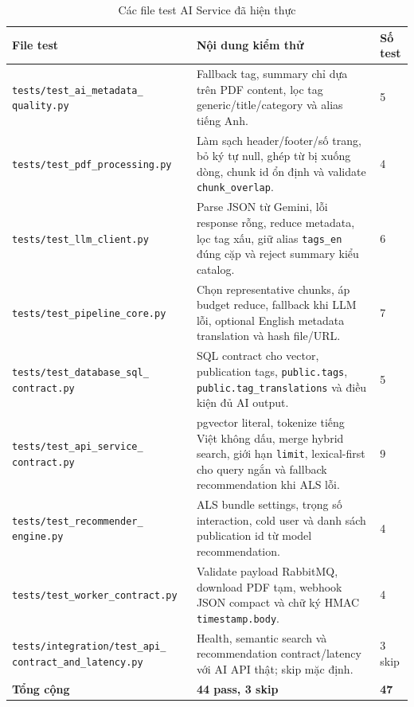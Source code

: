 \begin{table}[H]
\centering
\small %
\renewcommand{\arraystretch}{1.5} %
\begin{tabularx}{\textwidth}{|p{5.6cm}|>{\raggedright\arraybackslash}X|p{1.8cm}|}
\hline
\textbf{File test} & \textbf{Nội dung kiểm thử} & \textbf{Số test} \\
\hline
\texttt{tests/test\_ai\_metadata\_} \newline \texttt{quality.py} & Fallback tag, summary chỉ dựa trên PDF content, lọc tag generic/title/category và alias tiếng Anh. & 5 \\
\hline
\texttt{tests/test\_pdf\_processing.py} & Làm sạch header/footer/số trang, bỏ ký tự null, ghép từ bị xuống dòng, chunk id ổn định và validate \texttt{chunk\_overlap}. & 4 \\
\hline
\texttt{tests/test\_llm\_client.py} & Parse JSON từ Gemini, lỗi response rỗng, reduce metadata, lọc tag xấu, giữ alias \texttt{tags\_en} đúng cặp và reject summary kiểu catalog. & 6 \\
\hline
\texttt{tests/test\_pipeline\_core.py} & Chọn representative chunks, áp budget reduce, fallback khi LLM lỗi, optional English metadata translation và hash file/URL. & 7 \\
\hline
\texttt{tests/test\_database\_sql\_} \newline \texttt{contract.py} & SQL contract cho vector, publication tags, \texttt{public.tags}, \texttt{public.tag\_translations} và điều kiện đủ AI output. & 5 \\
\hline
\texttt{tests/test\_api\_service\_} \newline \texttt{contract.py} & pgvector literal, tokenize tiếng Việt không dấu, merge hybrid search, giới hạn \texttt{limit}, lexical-first cho query ngắn và fallback recommendation khi ALS lỗi. & 9 \\
\hline
\texttt{tests/test\_recommender\_} \newline \texttt{engine.py} & ALS bundle settings, trọng số interaction, cold user và danh sách publication id từ model recommendation. & 4 \\
\hline
\texttt{tests/test\_worker\_contract.py} & Validate payload RabbitMQ, download PDF tạm, webhook JSON compact và chữ ký HMAC \texttt{timestamp.body}. & 4 \\
\hline
\texttt{tests/integration/test\_api\_} \newline \texttt{contract\_and\_latency.py} & Health, semantic search và recommendation contract/latency với AI API thật; skip mặc định. & 3 skip \\
\hline
\textbf{Tổng cộng} & \textbf{44 pass, 3 skip} & \textbf{47} \\
\hline
\end{tabularx}
\caption{Các file test AI Service đã hiện thực}
\label{tab:ai_test_files}
\end{table}
